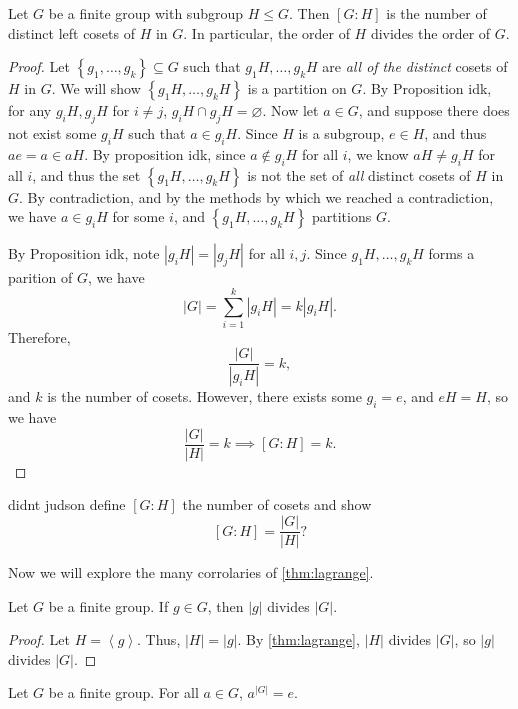 \begin{theorem}[Lagrange]\label{thm:lagrange}
	Let $G$ be a finite group with subgroup $H\leq G$. Then $[G:H]$ is the number of distinct left cosets of $H$ in $G$. In particular, the order of $H$ divides the order of $G$.
\end{theorem}
\begin{proof}
	Let $\left\{ g_1, \ldots,g_k \right\} \subseteq G$ such that $g_1H, \ldots,g_kH$ are \emph{all of the distinct} cosets of $H$ in $G$. We will show $\left\{ g_1H, \ldots, g_kH \right\} $ is a partition on $G$. By Proposition idk, for any $g_iH,g_jH$ for $i\neq j$, $g_iH\cap g_jH=\varnothing$. Now let $a\in G$, and suppose there does not exist some $g_iH$ such that $a\in g_iH$. Since $H$ is a subgroup, $e\in H$, and thus $ae=a\in aH$. By proposition idk, since  $a\notin g_iH$ for all $i$, we know $aH\neq g_iH$ for all $i$, and thus the set $\left\{ g_1H, \ldots, g_kH \right\} $ is not the set of \emph{all} distinct cosets of $H$ in $G$. By contradiction, and by the methods by which we reached a contradiction, we have $a\in g_iH$ for some $i$, and $\left\{ g_1H, \ldots, g_kH \right\} $ partitions $G$.

	By Proposition idk, note $\left| g_iH \right| =\left| g_jH \right| $ for all $i,j$. Since $g_1H, \ldots, g_kH$ forms a parition of $G$, we have
	\[
		\left| G \right| =\sum_{i=1}^{k} \left| g_iH \right| =k\left| g_iH \right| 
	.\]
	Therefore,
	\[
		\frac{\left| G \right| }{\left| g_iH \right| }=k
	,\]
	and $k$ is the number of cosets. However, there exists some $g_i=e$, and $eH=H$, so we have
	\[
		\frac{\left| G \right| }{\left| H \right| }=k \implies [G:H]=k
	.\]
\end{proof}
\begin{remark}
	didnt judson define $[G:H]$ the number of cosets and show
	\[
		[G:H]=\frac{\left| G \right| }{\left| H \right| }
	?\]
\end{remark}
Now we will explore the many corrolaries of \ref{thm:lagrange}.
\begin{corollary}\label{cor:as}
	Let $G$ be a finite group. If $g\in G$, then $\left| g \right| $ divides $\left| G \right| $.
\end{corollary}
\begin{proof}
	Let $H=\left<g \right>$. Thus, $\left| H \right| =\left| g \right| $. By \ref{thm:lagrange}, $\left| H \right| $ divides $\left| G \right| $, so $\left| g \right| $ divides $\left| G \right| $.
\end{proof}
\begin{corollary}
	Let $G$ be a finite group. For all $a\in G$, $a^{\left| G \right| }=e$.
\end{corollary}
